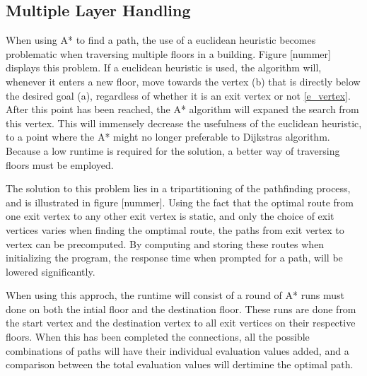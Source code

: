 \subsection{Multiple Layer Handling} \label{multlayhan}

When using A* to find a path, the use of a euclidean heuristic becomes problematic when traversing multiple floors in a building. Figure [nummer] displays this problem. If a euclidean heuristic is used, the algorithm will, whenever it enters a new floor, move towards the vertex (b) that is directly below the desired goal (a), regardless of whether it is an exit vertex or not \cref{e_vertex}. After this point has been reached, the A* algorithm will expaned the search from this vertex. This will immensely decrease the usefulness of the euclidean heuristic, to a point where the A* might no longer preferable to Dijkstras algorithm. Because a low runtime is required for the solution, a better way of traversing floors must be employed.

The solution to this problem lies in a tripartitioning of the pathfinding process, and is illustrated in figure [nummer]. Using the fact that the optimal route from one exit vertex to any other exit vertex is static, and only the choice of exit vertices varies when finding the omptimal route, the paths from exit vertex to vertex can be precomputed. By computing and storing these routes when initializing the program, the response time when prompted for a path, will be lowered significantly.

When using this approch, the runtime will consist of a round of A* runs must done on both the intial floor and the destination floor. These runs are done from the start vertex and the destination vertex to all exit vertices on their respective floors. When this has been completed the connections, all the possible combinations of paths will have their individual evaluation values added, and a comparison between the total evaluation values will dertimine the optimal path.

